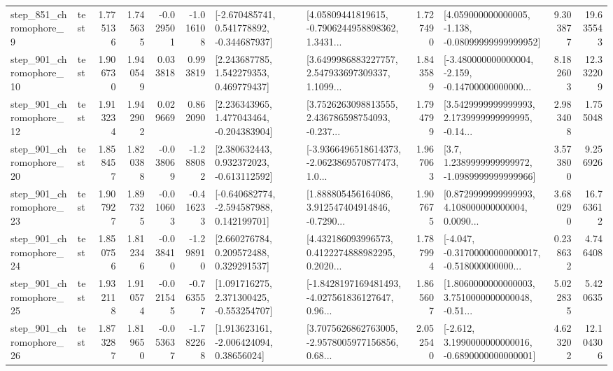\begin{tabular}{llrrrrllrlrr}
   step\_851\_chromophore\_9 &      test &      1.775136 &    1.745635 &     -0.029501 & -1.016108 &   [-2.670485741, 0.541778892, -0.344687937] &  [4.05809441819615, -0.7906244958898362, 1.3431... &       1.727490 &  [4.059000000000005, -1.138, -0.08099999999999952] &            9.303877 &         19.635543 \\
  step\_901\_chromophore\_10 &      test &      1.906730 &    1.940549 &      0.033818 &  0.993819 &     [2.243687785, 1.542279353, 0.469779437] &  [3.6499986883227757, 2.547933697309337, 1.1099... &       1.843589 &  [-3.480000000000004, -2.159, -0.14700000000000... &            8.182603 &         12.332209 \\
  step\_901\_chromophore\_12 &      test &      1.913234 &    1.942902 &      0.029669 &  0.862090 &    [2.236343965, 1.477043464, -0.204383904] &  [3.7526263098813555, 2.436786598754093, -0.237... &       1.794799 &  [3.5429999999999993, 2.1739999999999995, -0.14... &            2.983408 &          1.755048 \\
  step\_901\_chromophore\_20 &      test &      1.858457 &    1.820388 &     -0.038069 & -1.288082 &    [2.380632443, 0.932372023, -0.613112592] &  [-3.9366496518614373, -2.0623869570877473, 1.0... &       1.967063 &     [3.7, 1.2389999999999972, -1.0989999999999966] &            3.573800 &          9.256926 \\
  step\_901\_chromophore\_23 &      test &      1.907927 &    1.897325 &     -0.010603 & -0.416233 &   [-0.640682774, -2.594587988, 0.142199701] &  [1.888805456164086, 3.912547404914846, -0.7290... &       1.907675 &  [0.8729999999999993, 4.108000000000004, 0.0090... &            3.680290 &         16.763612 \\
  step\_901\_chromophore\_24 &      test &      1.850756 &    1.812346 &     -0.038410 & -1.298910 &     [2.660276784, 0.209572488, 0.329291537] &  [4.432186093996573, 0.4122274888982295, 0.2020... &       1.787994 &  [-4.047, -0.31700000000000017, -0.518000000000... &            0.238632 &          4.746408 \\
  step\_901\_chromophore\_25 &      test &      1.932118 &    1.910574 &     -0.021545 & -0.763557 &    [1.091716275, 2.371300425, -0.553254707] &  [-1.8428197169481493, -4.027561836127647, 0.96... &       1.865607 &  [1.8060000000000003, 3.7510000000000048, -0.51... &            5.022835 &          5.420635 \\
  step\_901\_chromophore\_26 &      test &      1.873287 &    1.819650 &     -0.053637 & -1.782268 &     [1.913623161, -2.006424094, 0.38656024] &  [3.7075626862763005, -2.9578005977156856, 0.68... &       2.052540 &  [-2.612, 3.1990000000000016, -0.6890000000000001] &            4.623202 &         12.104306 \\

\end{tabular}
